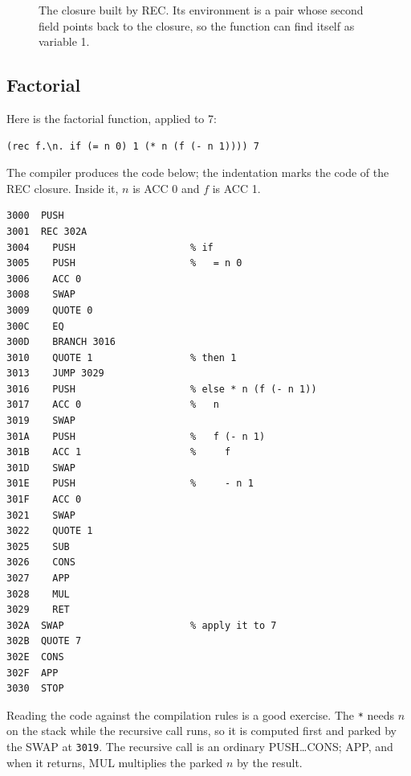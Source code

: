 \documentclass[11pt,a4paper]{article}
\newcommand{\ins}[1]{\textsf{#1}}
\newcommand{\clo}[2]{[#1 : #2]}
\newcommand{\pr}[2]{(#1,\, #2)}
\theoremstyle{definition}
\theoremstyle{plain}
\begin{document}
\begin{figure}[t]
\centering
{}
\caption{The closure built by \ins{REC}. Its environment is a pair whose
second field points back to the closure, so the function can find itself as
variable 1.}
\label{fig:rec}
\end{figure}

\subsection{Factorial}

Here is the factorial function, applied to 7:
\begin{lstlisting}[style=cam]
(rec f.\n. if (= n 0) 1 (* n (f (- n 1)))) 7
\end{lstlisting}
The compiler produces the code below; the indentation marks the code of the
\ins{REC} closure. Inside it, $n$ is \ins{ACC 0} and $f$ is \ins{ACC 1}.
\begin{lstlisting}[style=cam]
3000  PUSH
3001  REC 302A
3004    PUSH                    % if
3005    PUSH                    %   = n 0
3006    ACC 0
3008    SWAP
3009    QUOTE 0
300C    EQ
300D    BRANCH 3016
3010    QUOTE 1                 % then 1
3013    JUMP 3029
3016    PUSH                    % else * n (f (- n 1))
3017    ACC 0                   %   n
3019    SWAP
301A    PUSH                    %   f (- n 1)
301B    ACC 1                   %     f
301D    SWAP
301E    PUSH                    %     - n 1
301F    ACC 0
3021    SWAP
3022    QUOTE 1
3025    SUB
3026    CONS
3027    APP
3028    MUL
3029    RET
302A  SWAP                      % apply it to 7
302B  QUOTE 7
302E  CONS
302F  APP
3030  STOP
\end{lstlisting}
Reading the code against the compilation rules is a good exercise. The \verb|*|
needs $n$ on the stack while the recursive call runs, so it is computed first
and parked by the \ins{SWAP} at \texttt{3019}. The recursive call is an
ordinary \ins{PUSH}\dots\ins{CONS; APP}, and when it returns, \ins{MUL}
multiplies the parked $n$ by the result.
\end{document}
